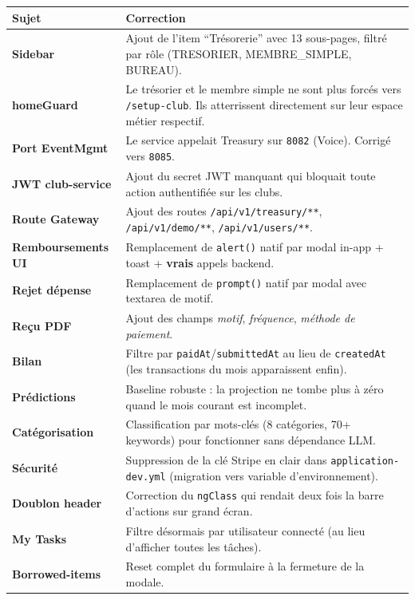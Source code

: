 \documentclass[11pt,a4paper]{article}
\begin{document}
\begin{table}[h]
  \centering
  \small
  \begin{tabularx}{\linewidth}{>{\bfseries}lX}
    \toprule
    Sujet & Correction \\
    \midrule
    Sidebar           & Ajout de l'item ``Trésorerie'' avec 13 sous-pages, filtré par rôle (TRESORIER, MEMBRE\_SIMPLE, BUREAU). \\
    homeGuard         & Le trésorier et le membre simple ne sont plus forcés vers \texttt{/setup-club}. Ils atterrissent directement sur leur espace métier respectif. \\
    Port EventMgmt    & Le service appelait Treasury sur \texttt{8082} (Voice). Corrigé vers \texttt{8085}. \\
    JWT club-service  & Ajout du secret JWT manquant qui bloquait toute action authentifiée sur les clubs. \\
    Route Gateway     & Ajout des routes \texttt{/api/v1/treasury/**}, \texttt{/api/v1/demo/**}, \texttt{/api/v1/users/**}. \\
    Remboursements UI & Remplacement de \texttt{alert()} natif par modal in-app + toast + \textbf{vrais} appels backend. \\
    Rejet dépense     & Remplacement de \texttt{prompt()} natif par modal avec textarea de motif. \\
    Reçu PDF          & Ajout des champs \emph{motif}, \emph{fréquence}, \emph{méthode de paiement}. \\
    Bilan             & Filtre par \texttt{paidAt}/\texttt{submittedAt} au lieu de \texttt{createdAt} (les transactions du mois apparaissent enfin). \\
    Prédictions       & Baseline robuste : la projection ne tombe plus à zéro quand le mois courant est incomplet. \\
    Catégorisation    & Classification par mots-clés (8 catégories, 70+ keywords) pour fonctionner sans dépendance LLM. \\
    Sécurité          & Suppression de la clé Stripe en clair dans \texttt{application-dev.yml} (migration vers variable d'environnement). \\
    Doublon header    & Correction du \texttt{ngClass} qui rendait deux fois la barre d'actions sur grand écran. \\
    My Tasks          & Filtre désormais par utilisateur connecté (au lieu d'afficher toutes les tâches). \\
    Borrowed-items    & Reset complet du formulaire à la fermeture de la modale. \\

\end{tabularx}
\end{table}
\end{document}
